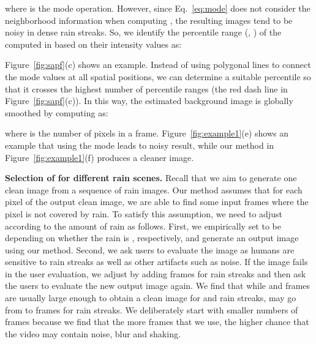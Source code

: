\documentclass[10pt,twocolumn,letterpaper]{article}
\begin{document}
where  is the mode operation. However, since Eq.~\ref{eq:mode} does not consider the neighborhood information when computing , the resulting images tend to be noisy in dense rain streaks. So, we identify the percentile range (, ) of the computed  in  based on their intensity values as:


Figure~\ref{fig:sapf}(c) shows an example. Instead of using polygonal lines to connect the mode values  at all spatial positions,
we can determine a suitable percentile  so that it crosses the highest number of percentile ranges (the red dash line in Figure~\ref{fig:sapf}(c)).
In this way, the estimated background image is globally smoothed by computing  as:

where  is the number of pixels in a frame. Figure~\ref{fig:example1}(e) shows an example that using the mode leads to noisy result, while our method in Figure~\ref{fig:example1}(f) produces a cleaner image.

\begin{figure*}[t]
	\centering
		\caption{A deraining example using a synthetic rain video of 100 frames. We show the best result of each method here. Refer to the supplementary for more results. }
		\label{fig:example1}
		\vspace{-3mm}
\end{figure*}


{\bf Selection of  for different rain scenes.} Recall that we aim to generate one clean image from a sequence of  rain images. Our method assumes that for each pixel of the output clean image, we are able to find some input frames where the pixel is not covered by rain. To satisfy this assumption, we need to adjust  according to the amount of rain as follows.
First, we empirically set  to be  depending on whether the rain is , respectively, and generate an output image using our method.
Second, we ask users to evaluate the image as humans are sensitive to rain streaks as well as other artifacts such as noise.
If the image fails in the user evaluation, we adjust  by adding  frames for  rain streaks and then ask the users to evaluate the new output image again.
We find that while  and  frames are usually large enough to obtain a clean image for  and  rain streaks,  may go from  to  frames for  rain streaks. We deliberately start with smaller numbers of frames because we find that the more frames that we use, the higher chance that the video may contain noise, blur and shaking.
\end{document}
